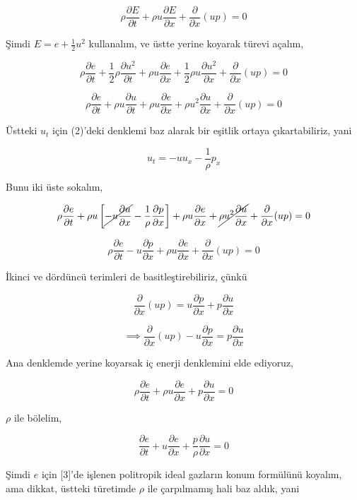 \documentclass[12pt,fleqn]{article}\usepackage{../../common}
\begin{document}
$$
\rho \frac{\partial E}{\partial t} +
\rho u \frac{\partial E}{\partial x} +
\frac{\partial }{\partial x} (up) = 0
$$

Şimdi $E = e + \frac{1}{2} u^2$ kullanalım, ve üstte yerine koyarak türevi
açalım,

$$
\rho \frac{\partial e}{\partial t} + \frac{1}{2} \rho \frac{\partial u^2}{\partial t}+
\rho u \frac{\partial e}{\partial x} + \frac{1}{2} \rho u \frac{\partial u^2}{\partial x}+
\frac{\partial }{\partial x} (up) = 0
$$

$$
\rho \frac{\partial e}{\partial t} +
\rho u \frac{\partial u}{\partial t} +
\rho u \frac{\partial e}{\partial x} +
\rho u^2 \frac{\partial u}{\partial x} +
\frac{\partial }{\partial x}(up) = 0
$$

Üstteki $u_t$ için (2)'deki denklemi baz alarak bir eşitlik ortaya
çıkartabiliriz, yani

$$
u_t = -u u_x - \frac{1}{\rho} p_x
$$

Bunu iki üste sokalım,

$$
\rho \frac{\partial e}{\partial t} +
\rho u \left[
  \cancel{-u \frac{\partial u}{\partial x}} - \frac{1}{\rho} \frac{\partial p}{\partial x}
\right] +
\rho u \frac{\partial e}{\partial x} +
\cancel{\rho u^2 \frac{\partial u}{\partial x}} +
\frac{\partial }{\partial x} (up) = 0
$$

$$
\rho \frac{\partial e}{\partial t} -
u \frac{\partial p}{\partial x} +
\rho u \frac{\partial e}{\partial x} +
\frac{\partial }{\partial x} (up) = 0
$$

İkinci ve dördüncü terimleri de basitleştirebiliriz, çünkü

$$
\frac{\partial }{\partial x} (up) =
u\frac{\partial p}{\partial x} + 
p\frac{\partial u}{\partial x}  
$$

$$
\implies
\frac{\partial }{\partial x} (up) - u\frac{\partial p}{\partial x} =
p\frac{\partial u}{\partial x}
$$

Ana denklemde yerine koyarsak iç enerji denklemini elde ediyoruz,

$$
\rho \frac{\partial e}{\partial t} +
\rho u \frac{\partial e}{\partial x} +
p \frac{\partial u}{\partial x} = 0
$$

$\rho$ ile bölelim,

$$
\frac{\partial e}{\partial t} +
u \frac{\partial e}{\partial x} +
\frac{p}{\rho} \frac{\partial u}{\partial x} = 0
$$

Şimdi $e$ için [3]'de işlenen politropik ideal gazların konum formülünü koyalım,
ama dikkat, üstteki türetimde $\rho$ ile çarpılmamış hali baz aldık, yani
\end{document}
